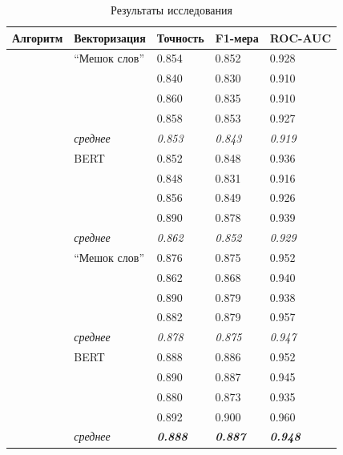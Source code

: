 \begin{table}[H]
	\begin{center}
		\captionsetup{justification=centering}
		\caption{\label{table:result1} Результаты исследования}
		\begin{tabular}{|p{3cm}|p{4cm}|p{2.4cm}|p{2.4cm}|p{2.4cm}|}
				\hline
			Алгоритм & Векторизация & Точность & F1-мера & ROC-AUC \\
				\hline\hline
			
			& ``Мешок слов'' & 0.854 & 0.852 & 0.928 \\
				& & 0.840 & 0.830 & 0.910 \\
				& & 0.860 & 0.835 & 0.910 \\
				& & 0.858 & 0.853 & 0.927 \\
				 & \textit{среднее} & \textit{0.853} & \textit{0.843} & \textit{0.919} \\
			& BERT & 0.852 & 0.848 & 0.936 \\
				& & 0.848 & 0.831 & 0.916 \\
				& & 0.856 & 0.849 & 0.926 \\
				& & 0.890 & 0.878 & 0.939 \\
				 & \textit{среднее} & \textit{0.862} & \textit{0.852} & \textit{0.929} \\
			\hline\hline
			
			& ``Мешок слов'' & 0.876 & 0.875 & 0.952 \\
				&& 0.862 & 0.868 & 0.940 \\
				&& 0.890 & 0.879 & 0.938 \\
				&& 0.882 & 0.879 & 0.957 \\
				 & \textit{среднее} & \textit{0.878} & \textit{0.875} & \textit{0.947} \\
			& BERT & 0.888 & 0.886 & 0.952 \\
				&& 0.890 & 0.887 & 0.945 \\
				&& 0.880 & 0.873 & 0.935 \\
				&& 0.892 & 0.900 & 0.960 \\
				 & \textit{среднее} & \textbf{\textit{0.888}} & \textbf{\textit{0.887}} & \textbf{\textit{0.948}} \\
			\hline\hline
			

\end{tabular}
\end{center}
\end{table}
